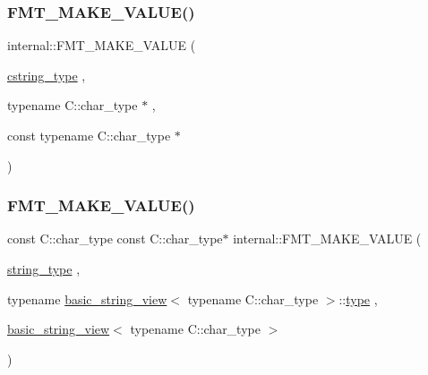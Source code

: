 \subsubsection{\texorpdfstring{F\+M\+T\+\_\+\+M\+A\+K\+E\+\_\+\+V\+A\+L\+U\+E()}{FMT\_MAKE\_VALUE()}\hspace{0.1cm}{\footnotesize\ttfamily [2/3]}}
{\footnotesize\ttfamily internal\+::\+F\+M\+T\+\_\+\+M\+A\+K\+E\+\_\+\+V\+A\+L\+UE (\begin{DoxyParamCaption}\item[{\hyperlink{namespaceinternal_a8661864098ac0acff9a6dd7e66f59038a97e784de660e3e6971e031779c070b62}{cstring\+\_\+type}}]{,  }\item[{typename C\+::char\+\_\+type $\ast$}]{,  }\item[{const typename C\+::char\+\_\+type $\ast$}]{ }\end{DoxyParamCaption})}

\mbox{\label{namespaceinternal_ab35f0ca6e0be6907eea60addbc5428b8}} 
\subsubsection{\texorpdfstring{F\+M\+T\+\_\+\+M\+A\+K\+E\+\_\+\+V\+A\+L\+U\+E()}{FMT\_MAKE\_VALUE()}\hspace{0.1cm}{\footnotesize\ttfamily [3/3]}}
{\footnotesize\ttfamily const C\+::char\+\_\+type const C\+::char\+\_\+type$\ast$ internal\+::\+F\+M\+T\+\_\+\+M\+A\+K\+E\+\_\+\+V\+A\+L\+UE (\begin{DoxyParamCaption}\item[{\hyperlink{namespaceinternal_a8661864098ac0acff9a6dd7e66f59038a8a104d760e6ea540da0d654ca8728d55}{string\+\_\+type}}]{,  }\item[{typename \hyperlink{classbasic__string__view}{basic\+\_\+string\+\_\+view}$<$ typename C\+::char\+\_\+type $>$\+::\hyperlink{namespaceinternal_a8661864098ac0acff9a6dd7e66f59038}{type}}]{,  }\item[{\hyperlink{classbasic__string__view}{basic\+\_\+string\+\_\+view}$<$ typename C\+::char\+\_\+type $>$}]{ }\end{DoxyParamCaption})}

\mbox{\label{namespaceinternal_a5da151108dc35a75dd46a3fa65cc8b94}} 
